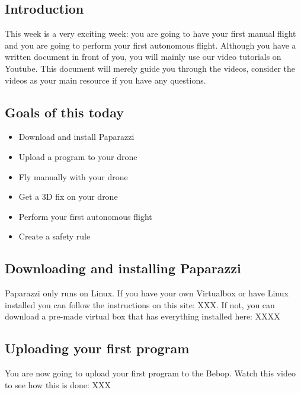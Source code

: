\documentclass{article}
\begin{document}

\subsection*{Introduction}
This week is a very exciting week: you are going to have your first manual flight and you are going to perform your first autonomous flight. Although you have a written document in front of you, you will mainly use our video tutorials on Youtube. This document will merely guide you through the videos, consider the videos as your main resource if you have any questions. 

\subsection*{Goals of this today}
\begin{itemize}
\item Download and install Paparazzi
\item Upload a program to your drone
\item Fly manually with your drone
\item Get a 3D fix on your drone
\item Perform your first autonomous flight
\item Create a safety rule
\end{itemize}

\subsection*{Downloading and installing Paparazzi}
Paparazzi only runs on Linux. If you have your own Virtualbox or have Linux installed you can follow the instructions on this site: XXX.
If not, you can download a pre-made virtual box that has everything installed here: XXXX

\subsection*{Uploading your first program}
You are now going to upload your first program to the Bebop. Watch this video to see how this is done: XXX
\end{document}

